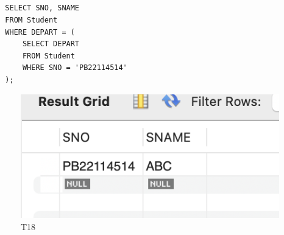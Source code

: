 \documentclass[UTF8]{ctexart}
\begin{document}
\subsection{}
\begin{lstlisting}
  SELECT SNO, SNAME
  FROM Student
  WHERE DEPART = (
      SELECT DEPART
      FROM Student
      WHERE SNO = 'PB22114514'
  );
\end{lstlisting}
\begin{figure}[H]
  \centering
  \includegraphics[scale=0.7]{pics/18.png}
  \caption*{T18}
\end{figure}
\end{document}
